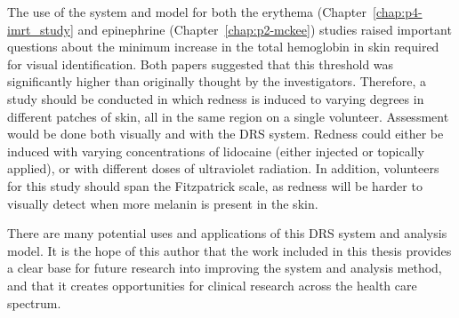 The use of the system and model for both the erythema (Chapter~\ref{chap:p4-imrt_study} and epinephrine (Chapter~\ref{chap:p2-mckee}) studies raised important questions about the minimum increase in the total hemoglobin in skin required for visual identification. Both papers suggested that this threshold was significantly higher than originally thought by the investigators. Therefore, a study should be conducted in which redness is induced to varying degrees in different patches of skin, all in the same region on a single volunteer. Assessment would be done both visually and with the DRS system. Redness could either be induced with varying concentrations of lidocaine (either injected or topically applied), or with different doses of ultraviolet radiation.\cite{Diffey1991,Harrison2002} In addition, volunteers for this study should span the Fitzpatrick scale,\cite{Fitzpatrick1988} as redness will be harder to visually detect when more melanin is present in the skin.

There are many potential uses and applications of this DRS system and analysis model. It is the hope of this author that the work included in this thesis provides a clear base for future research into improving the system and analysis method, and that it creates opportunities for clinical research across the health care spectrum.



